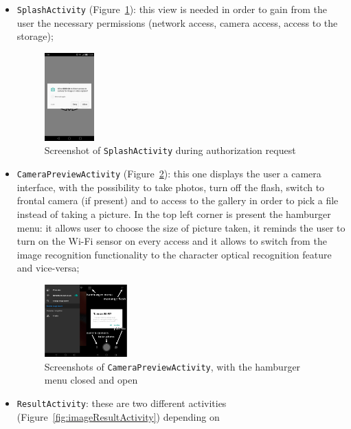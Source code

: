\begin{itemize}
  \item \texttt{SplashActivity} (Figure~\ref{fig:splash}): this view is needed in order to gain from the user
    the necessary permissions (network access, camera access, access to
    the storage);
    \begin{figure}[h]
        \centering
        \includegraphics[width=0.18\textwidth]{../img/splash}
        \caption{Screenshot of \texttt{SplashActivity} during authorization request}
        \label{fig:splash}
    \end{figure}
  \item \texttt{CameraPreviewActivity} (Figure~\ref{fig:mainActivity}): this one displays the user a camera
    interface, with the possibility to take photos, turn off the flash, switch
    to frontal camera (if present) and to access to the gallery in order to
    pick a file instead of taking a picture. In the top left corner is present
    the hamburger menu: it allows user to choose the size of picture taken,
    it reminds the user to turn on the Wi-Fi sensor on every access and it
    allows to switch from the image recognition functionality to the
    character optical recognition feature and vice-versa;
    \begin{figure}[h]
        \centering
        \includegraphics[width=0.30\textwidth]{../img/main_activity}
        \caption{Screenshots of \texttt{CameraPreviewActivity}, with the hamburger menu 
                 closed and open}
        \label{fig:mainActivity}
    \end{figure}
  \item \texttt{ResultActivity}: these are two different activities (Figure~\ref{fig:imageResultActivity}) depending on

\end{itemize}
